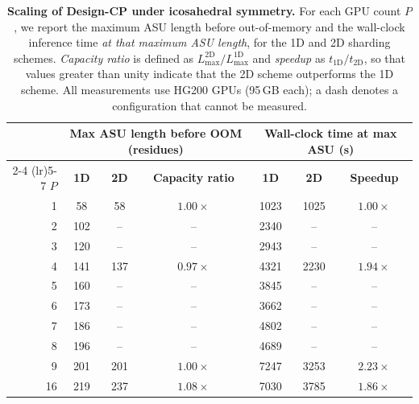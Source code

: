 \documentclass{article}
\theoremstyle{plain}
\theoremstyle{definition}
\theoremstyle{remark}
\begin{document}
\begin{table}[!t]
  \centering
  \small
  \caption{\textbf{Scaling of Design-CP under icosahedral symmetry.} For each GPU count $P$, we report the maximum ASU length before out-of-memory and the wall-clock inference time \emph{at that maximum ASU length}, for the 1D and 2D sharding schemes. \emph{Capacity ratio} is defined as $L_{\max}^{\mathrm{2D}}/L_{\max}^{\mathrm{1D}}$ and \emph{speedup} as $t_{\mathrm{1D}}/t_{\mathrm{2D}}$, so that values greater than unity indicate that the 2D scheme outperforms the 1D scheme. All measurements use HG200 GPUs (95\,GB each); a dash denotes a configuration that cannot be measured.}
  \label{tab:scaling}
  \begin{tabular}{rcccccc}
    \toprule
    & \multicolumn{3}{c}{\textbf{Max ASU length before OOM} (residues)} & \multicolumn{3}{c}{\textbf{Wall-clock time at max ASU} (s)} \\
    \cmidrule(lr){2-4} \cmidrule(lr){5-7}
    $P$ & \textbf{1D} & \textbf{2D} & \textbf{Capacity ratio} & \textbf{1D} & \textbf{2D} & \textbf{Speedup} \\
    \midrule
    1  & 58  & 58  & $1.00\times$ & 1023 & 1025 & $1.00\times$ \\
    2  & 102 & --  & --           & 2340 & --   & --           \\
    3  & 120 & --  & --           & 2943 & --   & --           \\
    4  & 141 & 137 & $0.97\times$ & 4321 & 2230 & $1.94\times$ \\
    5  & 160 & --  & --           & 3845 & --   & --           \\
    6  & 173 & --  & --           & 3662 & --   & --           \\
    7  & 186 & --  & --           & 4802 & --   & --           \\
    8  & 196 & --  & --           & 4689 & --   & --           \\
    9  & 201 & 201 & $1.00\times$ & 7247 & 3253 & $2.23\times$ \\
    16 & 219 & 237 & $1.08\times$ & 7030 & 3785 & $1.86\times$ \\
    \bottomrule
  \end{tabular}
\end{table}
\end{document}

